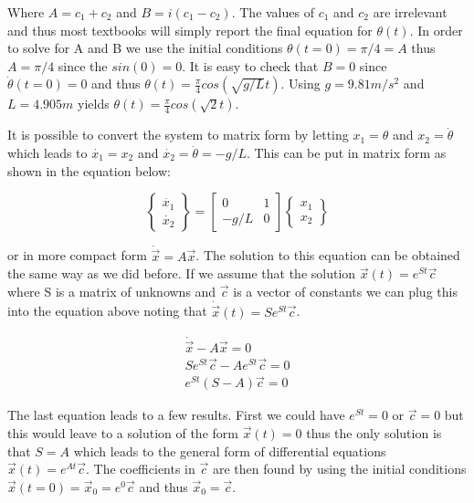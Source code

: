 \begin{enumerate}
    Where $A = c_1+c_2$ and $B = i(c_1-c_2)$. The values of $c_1$ and
    $c_2$ are irrelevant and thus most textbooks will simply report
    the final equation for $\theta(t)$. In order to solve for A and B we use the initial conditions
    $\theta(t=0) = \pi/4 = A$ thus $A = \pi/4$ since the $sin(0) =
    0$. It is easy to check that $B=0$ since $\dot{\theta}(t=0) = 0$
    and thus $\theta(t) = \frac{\pi}{4} cos(\sqrt{g/L} t)$. Using $g = 9.81
    m/s^2$ and $L = 4.905 m$ yields $\theta(t) = \frac{\pi}{4}
    cos(\sqrt{2} t)$. 

    It is possible to convert the system to matrix form by letting
    $x_1 = \theta$ and $x_2 = \dot{\theta}$ which leads to 
    $\dot{x_1} = x_2$ and $\dot{x_2} = \ddot{\theta} = -g/L$. This can
    be put in matrix form as shown in the equation below:

    \begin{equation}
      \begin{Bmatrix} \dot{x_1} \\ \dot{x_2} \end{Bmatrix}
      = \begin{bmatrix} 0 & 1 \\ -g/L &
        0 \end{bmatrix} \begin{Bmatrix} x_1 \\ x_2 \end{Bmatrix}
    \end{equation}

    or in more compact form $\dot{\vec{x}} = A \vec{x}$. The solution
    to this equation can be obtained the same way as we did before. If
    we assume that the solution $\vec{x}(t) = e^{St}\vec{c}$ where S
    is a matrix of unknowns and $\vec{c}$ is a vector of constants we
    can plug this into the equation above noting that
    $\dot{\vec{x}}(t) = Se^{St}\vec{c}$.

    \begin{equation}
      \begin{matrix}
        \dot{\vec{x}} - A\vec{x} = 0 \\
        Se^{St}\vec{c} - Ae^{St}\vec{c} = 0 \\
        e^{St}(S-A)\vec{c} = 0
      \end{matrix}
    \end{equation}
    
    The last equation leads to a few results. First we could have
    $e^{St} = 0$ or $\vec{c} = 0$ but this would leave to a solution
    of the form $\vec{x}(t) = 0$ thus the only solution is that $S=A$
    which leads to the general form of differential equations
    $\vec{x}(t) = e^{At}\vec{c}$. The coefficients in $\vec{c}$ are
    then found by using the initial conditions
    $\vec{x}(t=0)=\vec{x}_0=e^0\vec{c}$ and thus $\vec{x}_0=\vec{c}$.


\end{enumerate}
